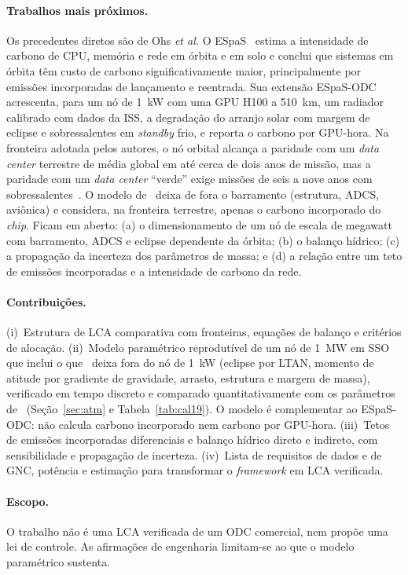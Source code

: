 \documentclass[11pt,a4paper]{article}
\begin{document}
\paragraph{Trabalhos mais próximos.} Os precedentes diretos são de Ohs
\emph{et al.} O ESpaS~\cite{r18} estima a intensidade de carbono de CPU,
memória e rede em órbita e em solo e conclui que sistemas em órbita têm custo
de carbono significativamente maior, principalmente por emissões incorporadas
de lançamento e reentrada. Sua extensão ESpaS-ODC~\cite{r19} acrescenta, para
um nó de 1~kW com uma GPU H100 a 510~km, um radiador calibrado com dados da
ISS, a degradação do arranjo solar com margem de eclipse e sobressalentes em
\emph{standby} frio, e reporta o carbono por GPU-hora. Na fronteira adotada
pelos autores, o nó orbital alcança a paridade com um \emph{data center}
terrestre de média global em até cerca de dois anos de missão, mas a paridade
com um \emph{data center} ``verde'' exige missões de seis a nove anos com
sobressalentes~\cite{r19}. O modelo de~\cite{r19} deixa de fora o barramento
(estrutura, ADCS, aviônica) e considera, na fronteira terrestre, apenas o
carbono incorporado do \emph{chip}. Ficam em aberto: (a) o dimensionamento de
um nó de escala de megawatt com barramento, ADCS e eclipse dependente da
órbita; (b) o balanço hídrico; (c) a propagação da incerteza dos parâmetros de
massa; e (d) a relação entre um teto de emissões incorporadas e a intensidade
de carbono da rede.

\paragraph{Contribuições.} (i)~Estrutura de LCA comparativa com fronteiras,
equações de balanço e critérios de alocação. (ii)~Modelo paramétrico
reprodutível de um nó de 1~MW em SSO que inclui o que~\cite{r19} deixa fora do
nó de 1~kW (eclipse por LTAN, momento de atitude por gradiente de gravidade,
arrasto, estrutura e margem de massa), verificado em tempo discreto e comparado
quantitativamente com os parâmetros de~\cite{r19} (Seção~\ref{sec:atm} e
Tabela~\ref{tab:cal19}). O modelo é complementar ao ESpaS-ODC: não calcula
carbono incorporado nem carbono por GPU-hora. (iii)~Tetos de emissões
incorporadas diferenciais e balanço hídrico direto e indireto, com
sensibilidade e propagação de incerteza. (iv)~Lista de requisitos de dados e de
GNC, potência e estimação para transformar o \emph{framework} em LCA
verificada.

\paragraph{Escopo.} O trabalho não é uma LCA verificada de um ODC comercial,
nem propõe uma lei de controle. As afirmações de engenharia limitam-se ao que o
modelo paramétrico sustenta.
\end{document}
